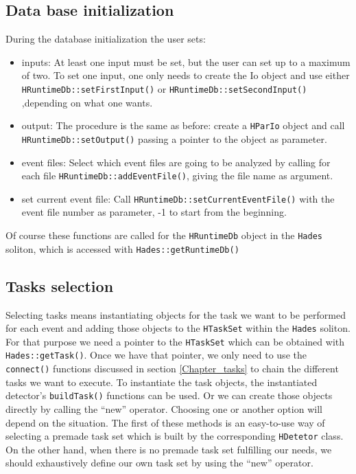 \subsection{Data base initialization}

During the database initialization the user sets:
\begin{itemize}
    \item inputs: At least one input must be set, but the user can set up to a 
    maximum of two. To set one input, one only needs to create the Io object 
    and use either \verb+HRuntimeDb::setFirstInput()+ or 
    \verb+HRuntimeDb::setSecondInput()+ ,depending on what one wants.
    \item output: The procedure is the same as before: create a \verb+HParIo+ 
    object and call 
    \newline
    \verb+HRuntimeDb::setOutput()+ passing a pointer to the 
    object as parameter.
    \item event files: Select which event files are going to be analyzed by 
    calling for each file 
    \newline
    \verb+HRuntimeDb::addEventFile()+, giving the file 
    name as argument.
    \item set current event file: Call \verb+HRuntimeDb::setCurrentEventFile()+ 
    with the event file number as parameter, -1 to start from the beginning.
\end{itemize}

Of course these functions are called for the \verb+HRuntimeDb+ object in the 
\verb+Hades+ soliton, which is accessed with \verb+Hades::getRuntimeDb()+

\subsection{Tasks selection}

Selecting tasks means instantiating objects for the task we want to be performed 
for each event and adding those objects to the \verb+HTaskSet+ within the \verb+Hades+ 
soliton. For that purpose we need a pointer to the \verb+HTaskSet+ which can be 
obtained with \verb+Hades::getTask()+. Once we have that pointer, we only need 
to use the \verb+connect()+ functions discussed in section \ref{Chapter_tasks} to 
chain the different tasks we want to execute.
To instantiate the task objects, the instantiated detector's \verb+buildTask()+ 
functions can be used. Or we can create those objects directly by calling the 
``new'' operator. Choosing one or another option will depend on the situation. 
The first of these methods is an easy-to-use way of selecting a premade task 
set which is built by the corresponding \verb+HDetetor+ class. On the other 
hand, when there is no premade task set fulfilling our needs, we should 
exhaustively define our own task set by using the ``new'' operator.

